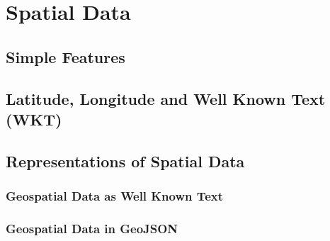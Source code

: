 \chapter{Spatial Data}\label{ch:spatial-data}
\lipsum[7-9]
\section{Simple Features}
\lipsum[9-11]
\section{Latitude, Longitude and Well Known Text (WKT)}
\lipsum[12-14]
\section{Representations of Spatial Data}
\lipsum[14-15]
\subsection{Geospatial Data as Well Known Text}
\lipsum[17-18]
\subsection{Geospatial Data in GeoJSON}
\lipsum[2-4]